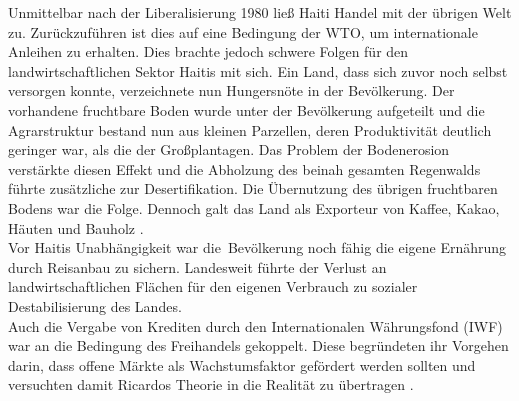 Unmittelbar nach der Liberalisierung 1980 ließ Haiti Handel mit der übrigen Welt zu. Zurückzuführen ist dies auf eine Bedingung der WTO, um internationale Anleihen zu erhalten. Dies brachte jedoch schwere Folgen für den landwirtschaftlichen Sektor Haitis mit sich. Ein Land, dass sich zuvor noch selbst versorgen konnte, verzeichnete nun Hungersnöte in der Bevölkerung. Der vorhandene fruchtbare Boden wurde unter der Bevölkerung aufgeteilt und die Agrarstruktur bestand nun aus kleinen Parzellen, deren Produktivität deutlich geringer war, als die der Großplantagen. Das Problem der Bodenerosion verstärkte diesen Effekt und die Abholzung des beinah gesamten Regenwalds führte zusätzliche zur Desertifikation. Die Übernutzung des übrigen fruchtbaren Bodens war die Folge. Dennoch galt das Land als Exporteur von Kaffee, Kakao, Häuten und Bauholz \cite[S. 76-77]{King.2005}.\\
%
 Vor Haitis Unabhängigkeit war die~Bevölkerung noch fähig die eigene Ernährung durch Reisanbau zu sichern. Landesweit führte der Verlust an landwirtschaftlichen Flächen für den eigenen Verbrauch zu sozialer Destabilisierung des Landes.\\
%
 Auch die Vergabe von Krediten durch den Internationalen Währungsfond (IWF) war an die Bedingung des Freihandels gekoppelt. Diese begründeten ihr Vorgehen darin, dass offene Märkte als Wachstumsfaktor gefördert werden sollten und versuchten damit Ricardos Theorie in die Realität zu übertragen \cite[S. 104]{Weiss.2008,InternationalMonetaryFund.2007}.\\
%
